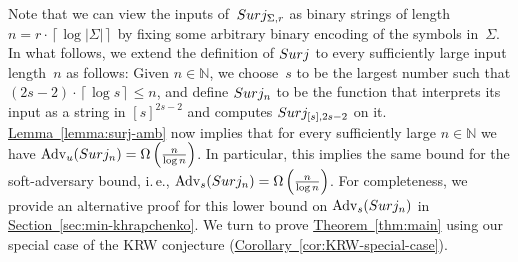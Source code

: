 \documentclass[11pt]{article}
\numberwithin{equation}{section}
\theoremstyle{definition}
\theoremstyle{plain}
\newcommand{\N}{\mathbb N}
\newcommand{\ie}{i.\,e.}
\newcommand{\expref}[2]{\hyperref[#2]{#1~\ref{#2}}}
\theoremstyle{definition}\newtheorem{notation}[theorem]{Notation}\theoremstyle{plain}
\renewcommand{\N}{\mathbb{N}}
\newcommand{\surj}{\textup{\textsf{Surj}}}
\newcommand{\Amb}{\mathrm{Adv}_{u}}
\newcommand{\Am}{\mathrm{Adv}_{s}}
\theoremstyle{definition}
\theoremstyle{plain}
\begin{document}
Note that we can view the inputs of~$\surj_{\Sigma,r}$ as binary
strings of length~$n=r\cdot\left\lceil \log\left|\Sigma\right|\right\rceil $
by fixing some arbitrary binary encoding of the symbols in~$\Sigma$.
In what follows, we extend the definition of $\surj$ to every sufficiently
large input length~$n$ as follows: Given $n\in\N$, we choose~$s$
to be the largest number such that $(2s-2)\cdot\left\lceil \log s\right\rceil \le n$,
and define $\surj_{n}$ to be the function that interprets its input
as a string in $\left[s\right]^{2s-2}$ and computes $\surj_{\left[s\right],2s-2}$
on it. \expref{Lemma}{lemma:surj-amb} now implies that for every sufficiently large
$n\in\N$ we have $\Amb(\surj_{n})=\Omega\left(\frac{n}{\log n}\right)$.
In particular, this implies the same bound for the soft-adversary
bound, \ie, $\Am(\surj_{n})=\Omega\left(\frac{n}{\log n}\right)$.
For completeness, we provide an alternative proof for this lower bound
on $\Am(\surj_{n})$ in \expref{Section}{sec:min-khrapchenko}. We turn to prove
\expref{Theorem}{thm:main} using our special case of the KRW conjecture 
(\expref{Corollary}{cor:KRW-special-case}). 
\end{document}
